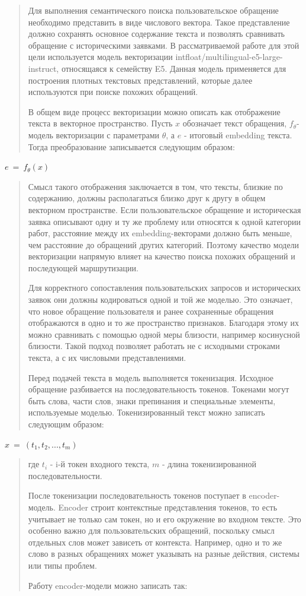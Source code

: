 \documentclass[
]{article}
\begin{document}
\begin{quote}
Для выполнения семантического поиска пользовательское обращение
необходимо представить в виде числового вектора. Такое представление
должно сохранять основное содержание текста и позволять сравнивать
обращение с историческими заявками. В рассматриваемой работе для этой
цели используется модель векторизации
intfloat/multilingual-e5-large-instruct, относящаяся к семейству E5.
Данная модель применяется для построения плотных текстовых
представлений, которые далее используются при поиске похожих обращений.

В общем виде процесс векторизации можно описать как отображение текста в
векторное пространство. Пусть \(x\) обозначает текст обращения,
\(f_{\theta}\)- модель векторизации с параметрами \(\theta\), а \(e\) -
итоговый embedding текста. Тогда преобразование записывается следующим
образом:
\end{quote}

\(e\  = \ f_{\theta}(x)\)

\begin{quote}
Смысл такого отображения заключается в том, что тексты, близкие по
содержанию, должны располагаться близко друг к другу в общем векторном
пространстве. Если пользовательское обращение и историческая заявка
описывают одну и ту же проблему или относятся к одной категории работ,
расстояние между их embedding-векторами должно быть меньше, чем
расстояние до обращений других категорий. Поэтому качество модели
векторизации напрямую влияет на качество поиска похожих обращений и
последующей маршрутизации.

Для корректного сопоставления пользовательских запросов и исторических
заявок они должны кодироваться одной и той же моделью. Это означает, что
новое обращение пользователя и ранее сохраненные обращения отображаются
в одно и то же пространство признаков. Благодаря этому их можно
сравнивать с помощью одной меры близости, например косинусной близости.
Такой подход позволяет работать не с исходными строками текста, а с их
числовыми представлениями.

Перед подачей текста в модель выполняется токенизация. Исходное
обращение разбивается на последовательность токенов. Токенами могут быть
слова, части слов, знаки препинания и специальные элементы, используемые
моделью. Токенизированный текст можно записать следующим образом:
\end{quote}

\(x\  = \ (t_{1},t_{2},...,t_{m})\)

\begin{quote}
где \(t_{i}\) - i-й токен входного текста, \(m\) - длина
токенизированной последовательности.

После токенизации последовательность токенов поступает в encoder-модель.
Encoder строит контекстные представления токенов, то есть учитывает не
только сам токен, но и его окружение во входном тексте. Это особенно
важно для пользовательских обращений, поскольку смысл отдельных слов
может зависеть от контекста. Например, одно и то же слово в разных
обращениях может указывать на разные действия, системы или типы проблем.

Работу encoder-модели можно записать так:
\end{quote}
\end{document}
